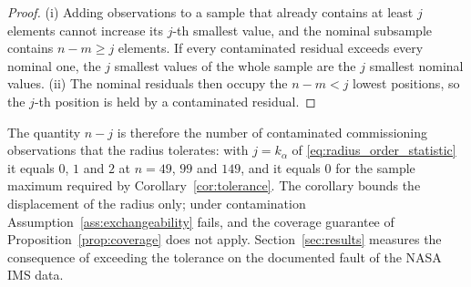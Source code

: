 \documentclass[a4paper]{cas-sc}
\newenvironment{reviewadded}{\par\color{blue}}{\par}
\begin{document}
\begin{reviewadded}
\begin{proof}
(i) Adding observations to a sample that already contains at least \(j\)
elements cannot increase its \(j\)-th smallest value, and the nominal
subsample contains \(n-m\ge j\) elements. If every contaminated residual
exceeds every nominal one, the \(j\) smallest values of the whole sample are
the \(j\) smallest nominal values. (ii) The nominal residuals then occupy the
\(n-m<j\) lowest positions, so the \(j\)-th position is held by a
contaminated residual.
\end{proof}

The quantity \(n-j\) is therefore the number of contaminated commissioning
observations that the radius tolerates: with
\(j=k_\alpha\) of \eqref{eq:radius_order_statistic} it equals \(0\), \(1\) and
\(2\) at \(n=49\), \(99\) and \(149\), and it equals \(0\) for the sample
maximum required by Corollary~\ref{cor:tolerance}. The corollary bounds the
displacement of the radius only; under contamination
Assumption~\ref{ass:exchangeability} fails, and the coverage guarantee of
Proposition~\ref{prop:coverage} does not apply. Section~\ref{sec:results}
measures the consequence of exceeding the tolerance on the documented
fault of the NASA IMS data.
\end{reviewadded}
\end{document}
